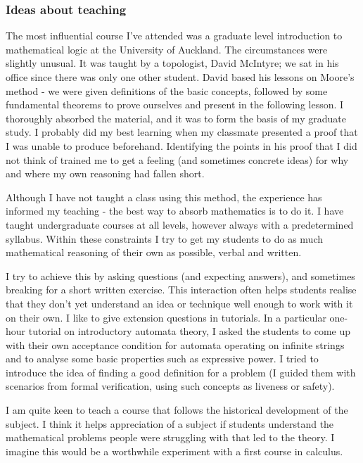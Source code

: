 \documentclass[12pt]{article}
\theoremstyle{plain} \numberwithin{equation}{section}
\theoremstyle{definition}
\begin{document}
\thispagestyle{fancy}

\subsubsection*{Ideas about teaching}

The most influential course I've attended was a graduate level introduction to mathematical logic at the University of Auckland. The circumstances were slightly unusual. It was taught by a topologist, David McIntyre; we sat in his office since there was only one other student. David based his lessons on Moore's method - we were given definitions of the basic concepts, followed by some fundamental theorems to prove ourselves and present in the following lesson. I thoroughly absorbed the material, and it was to form the basis of my graduate study. I probably did my best learning when my classmate presented a proof that I was unable to produce beforehand. Identifying the points in his proof that I did not think of trained me to get a feeling (and sometimes concrete ideas) for why and where my own reasoning had fallen short.

Although I have not taught a class using this method, the experience has informed my teaching - the best way to absorb mathematics is to do it. I have taught undergraduate courses at all levels, however always with a predetermined syllabus. Within these constraints I try to get my students to do as much mathematical reasoning of their own as possible, verbal and written.

I try to achieve this by asking questions (and expecting answers), and sometimes breaking for a short written exercise. This interaction often helps students realise that they don't yet understand an idea or technique well enough to work with it on their own. I like to give extension questions in tutorials. In a particular one-hour tutorial on introductory automata theory, I asked the students to come up with their own acceptance condition for automata operating on infinite strings and to analyse some basic properties such as expressive power. I tried to introduce the idea of finding a good definition for a problem (I guided them with scenarios from formal verification, using such concepts as liveness or safety).

I am quite keen to teach a course that follows the historical
development of the subject. I think it helps appreciation of a subject if students understand the mathematical problems people were struggling with that led to the theory. I imagine this would be a worthwhile experiment with a first course in calculus.
\end{document}

